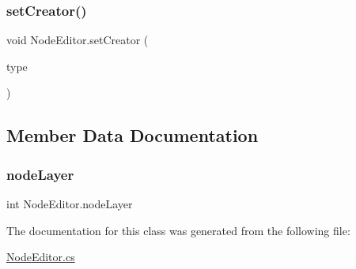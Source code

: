 \mbox{\label{class_node_editor_a24174978502582ab68d487d35f38d029}} 
\subsubsection{\texorpdfstring{set\+Creator()}{setCreator()}}
{\footnotesize\ttfamily void Node\+Editor.\+set\+Creator (\begin{DoxyParamCaption}\item[{\mbox{\hyperlink{_node_editor_8cs_afc5d9fc086bcd57827af91c5d369b625}{Node\+Creator\+Type}}}]{type }\end{DoxyParamCaption})}



\subsection{Member Data Documentation}
\mbox{\label{class_node_editor_aebb0d7bfb182de466d69abe21ab21fbb}} 
\subsubsection{\texorpdfstring{node\+Layer}{nodeLayer}}
{\footnotesize\ttfamily int Node\+Editor.\+node\+Layer}



The documentation for this class was generated from the following file\+:\begin{DoxyCompactItemize}
\item 
\mbox{\hyperlink{_node_editor_8cs}{Node\+Editor.\+cs}}\end{DoxyCompactItemize}
